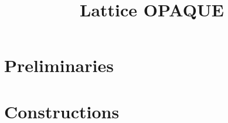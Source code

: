 \documentclass{article}
\author{}
\title{Lattice OPAQUE}
\begin{document}
    \maketitle	
   
%    
    
   \section{Preliminaries}
   \label{sec:prelims}
   
    
     \section{Constructions}
    \label{sec:constructions}
    

 
    
    
    

    \appendix
 
 
\end{document}
